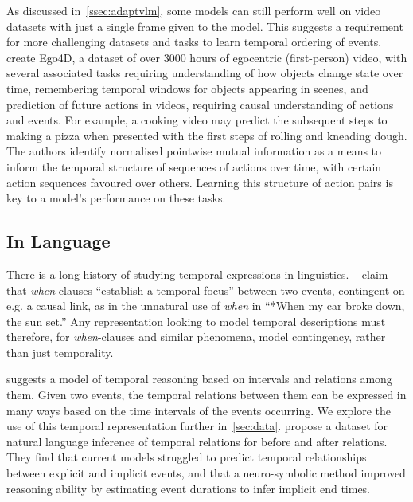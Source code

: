 As discussed in~\cref{ssec:adaptvlm}, some models can still perform well on
video datasets with just a single frame given to the model. This suggests a
requirement for more challenging datasets and tasks to learn temporal ordering
of events. \citet{grauman2022ego4d} create Ego4D, a dataset of over 3000 hours
of egocentric (first-person) video, with several associated tasks requiring
understanding of how objects change state over time, remembering temporal
windows for objects appearing in scenes, and prediction of future actions in
videos, requiring causal understanding of actions and events. For example, a
cooking video may predict the subsequent steps to making a pizza when presented
with the first steps of rolling and kneading dough. The authors identify
normalised pointwise mutual information as a means to inform the temporal
structure of sequences of actions over time, with certain action sequences
favoured over others. Learning this structure of action pairs is key to a
model's performance on these tasks.

\subsection{In Language}
\label{ssec:templang}
There is a long history of studying temporal expressions in linguistics.
~\citet{moens1988temporal} claim that \textit{when}-clauses ``establish a
temporal focus'' between two events, contingent on e.g. a causal link, as in
the unnatural use of \textit{when} in ``*When my car broke down, the sun set.''
Any representation looking to model temporal descriptions must therefore, for
\textit{when}-clauses and similar phenomena, model contingency, rather than
just temporality.

\citet{allen1983interval} suggests a model of temporal reasoning based on
intervals and relations among them. Given two events, the temporal relations
between them can be expressed in many ways based on the time intervals of the
events occurring. We explore the use of this temporal representation further
in~\cref{sec:data}. \citet{zhou2021tracie} propose a dataset for natural
language inference of temporal relations for before and after relations. They
find that current models struggled to predict temporal relationships between
explicit and implicit events, and that a neuro-symbolic method improved 
reasoning ability by estimating event durations to infer implicit end times.

